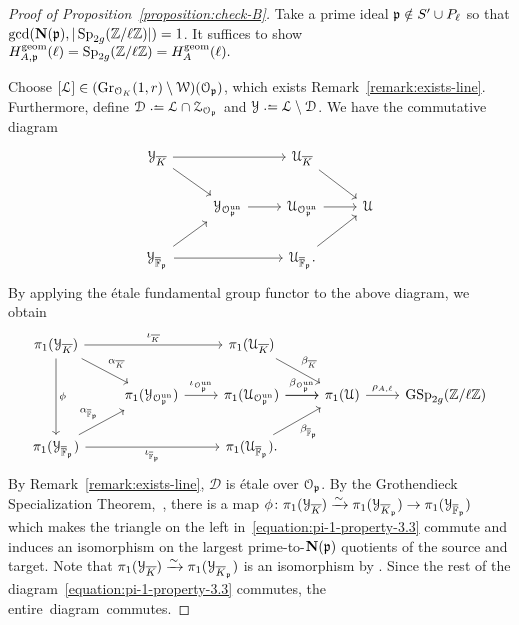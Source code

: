 \begin{proof}[Proof of Proposition~\ref{proposition:check-B}]
Take a prime ideal $\mathfrak{p} \notin S' \cup P_\ell$ so that $\gcd(\mathbf{N}(\mathfrak p), |\operatorname{Sp}_{2g}({\mathbb Z} / \ell {\mathbb Z})|) = 1$.
It suffices to show
$H_{A,\mathfrak p}^{\operatorname{geom}}(\ell) = \operatorname{Sp}_{2g}(\mathbb Z/ \ell \mathbb Z) = H_A^{\operatorname{geom}}(\ell).$

Choose $[\mathcal L] \in (\operatorname{Gr}_{\mathcal O_K}(1,r) \setminus \mathcal W)(\mathcal O_\mathfrak p)$, which exists Remark~\ref{remark:exists-line}. Furthermore, define $\mathcal D \defeq \mathcal L \cap \mathcal Z_{\mathcal O_\pp}$ and $\mathcal Y \defeq \mathcal L \setminus \mathcal D$.
We have the commutative diagram
	\begin{equation}
		\label{equation:}
		\nonumber
		\begin{tikzcd}
			\mathcal Y_{\overline K} \ar {rr} \ar {dr} & & \mathcal U_{\overline K} \ar {dr} \\
			& \mathcal Y_{\mathcal O_\pp^{\text{un}}} \ar {r} & \mc U_{\OO_\pp^{\on{un}}} \ar{r} & \mathcal U \\
			\mathcal Y_{\overline {{\mathbb F}}_\pp} \ar{ur}\ar{rr} & & \mathcal U_{\overline {{\mathbb F}}_\pp}. \ar{ur}
		\end{tikzcd}\end{equation}
	By applying the \'{e}tale fundamental group functor to the above diagram, we obtain
	\begin{equation}
		\label{equation:pi-1-property-3.3}
		\begin{tikzcd}
			\pi_1(\mathcal Y_{\overline K}) \ar{rr}{\iota_{\overline K}} \ar{dr}{\alpha_{\overline K}} \ar{dd}{\phi} & & \pi_1(\mathcal U_{\overline K}) \ar{dr}{\beta_{\overline K}}& \\
			& \pi_1(\mathcal Y_{\mathcal O_\pp^{\text{un}}}) \ar {r}{\iota_{\mathcal O_\pp^{\text{un}}}} & \pi_1(\mathcal U_{\OO_\pp^{\on{un}}}) \ar{r}{\beta_{\OO_\pp^{\on{un}}}} \ar{r} &  \pi_1(\mathcal U) \ar{r}{\rho_{A,\ell}}& \GSp_{2g}(\mathbb Z/\ell \ZZ)\\
			\pi_1(\mathcal Y_{\overline {{\mathbb F}}_\pp}) \ar{ur}{\alpha_{\overline {{\mathbb F}}_\pp}}\ar[swap]{rr}{\iota_{\overline {{\mathbb F}}_\pp}} & & \pi_1(\mathcal U_{\overline {{\mathbb F}}_\pp}) \ar[swap]{ur}{\beta_{\overline {\FF}_\pp}}. &
		\end{tikzcd}\end{equation}
	By Remark~\ref{remark:exists-line}, $\mathcal D$ is \'etale over $\mathcal O_\mathfrak p$. By the Grothendieck Specialization Theorem,~\cite[Th\'eor\`eme 4.4]{orgogozo2000theoreme},
there is a map
$\phi \colon \pi_1(\mathcal{Y}_{\overline{K}}) \xrightarrow{\sim} \pi_1(\mathcal{Y}_{\overline{K}_\mathfrak p}) \rightarrow \pi_1(\mathcal{Y}_{\overline{{\mathbb F}}_\mathfrak p})$
which makes the triangle on the left in~\eqref{equation:pi-1-property-3.3} commute and induces an isomorphism on the largest prime-to-$\mathbf{N}(\mathfrak p)$ quotients of the source and target.
Note that $\pi_1(\mathcal{Y}_{\overline{K}}) \xrightarrow{\sim} \pi_1(\mathcal{Y}_{\overline{K}_\mathfrak p})$ is an isomorphism by \cite[Expos\'e XIII, Proposition 4.6]{SGA1Grothendieck1971}.
Since the rest of the diagram~\eqref{equation:pi-1-property-3.3} commutes, the \mbox{entire diagram commutes.}


\end{proof}
